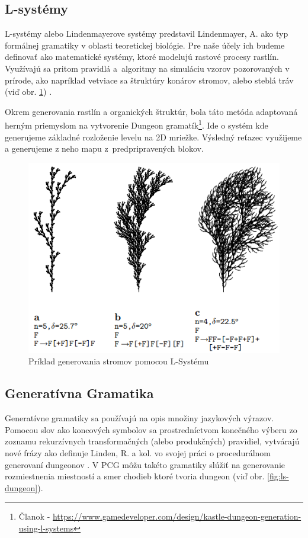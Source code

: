 \subsection{L-systémy}
L-systémy alebo Lindenmayerove systémy predstavil Lindenmayer, A. ako typ formálnej gramatiky v oblasti teoretickej biológie. Pre naše účely ich budeme definovať ako matematické systémy, ktoré modelujú rastové procesy rastlín. Využívajú sa pritom pravidlá a~algoritmy na simuláciu vzorov pozorovaných v prírode, ako napríklad vetviace sa štruktúry konárov stromov, alebo steblá tráv (viď obr. \ref{fig:ls-trees}) \cite{lindenmayer1968mathematical}.

Okrem generovania rastlín a organických štruktúr, bola táto metóda adaptovaná herným priemyslom na vytvorenie Dungeon gramatík\footnote{Članok - \url{https://www.gamedeveloper.com/design/kastle-dungeon-generation-using-l-systems}}. Ide o systém kde generujeme základné rozloženie levelu na 2D mriežke. Výsledný reťazec využijeme a generujeme z neho mapu z~predpripravených blokov.

\begin{figure} [H]
    \centering
    \includegraphics[width=0.5\linewidth]{obrazky-figures/ls-example.png}
    \caption{Príklad generovania stromov pomocou L-Systému\footnotemark}
    \label{fig:ls-trees}
\end{figure}


\subsection{Generatívna Gramatika}

Generatívne gramatiky sa používajú na opis množiny jazykových výrazov. Pomocou slov ako koncových symbolov sa prostredníctvom konečného výberu zo zoznamu rekurzívnych transformačných (alebo produkčných) pravidiel, vytvárajú nové frázy ako definuje Linden, R. a kol. vo svojej práci o procedurálnom generovaní dungeonov \cite{van2013procedural}. V PCG môžu takéto gramatiky slúžiť na generovanie rozmiestnenia miestností a smer chodieb ktoré tvoria dungeon (viď obr. \ref{fig:ls-dungeon}).

